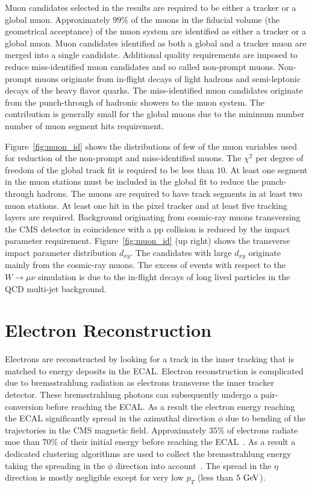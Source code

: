 Muon candidates selected in the results are required to be either a tracker or a global muon. Approximately $99\%$ of the muons in the fiducial volume (the geometrical acceptance) of the muon system are identified as either a tracker or a global muon. Muon candidates identified as both a global and a tracker muon are merged into a single candidate.  Additional quality requirements are imposed to reduce miss-identified muon candidates and so called non-prompt muons. Non-prompt muons originate from in-flight decays of light hadrons and semi-leptonic decays of the heavy flavor quarks. The miss-identified muon candidates originate from the punch-through of hadronic showers to the muon system. The contribution is generally small for the global muons due to the minimum number number of muon segment hits requirement. 

Figure~\ref{fig:muon_id} shows the distributions of few of the muon variables used for reduction of the non-prompt and miss-identified muons. The  $\chi^2$ per degree of freedom of the global track fit is required to be less than $10$. At least one segment in the muon stations must be included in the global fit to reduce the punch-through hadrons. The muons are required to have track segments in at least two muon stations. At least one hit in the pixel tracker and at least five tracking layers are required. Background originating from cosmic-ray muons transversing the CMS detector in coincidence with a pp collision is reduced by the impact parameter requirement. Figure~\ref{fig:muon_id} (up right) shows the transverse impact parameter distribution $d_{xy}$. The candidates with large $d_{xy}$ originate mainly from the cosmic-ray muons.  The excess of events with respect to the $W \rightarrow \mu\nu$ simulation is due to the in-flight decays of long lived particles in the QCD multi-jet background. 

\section{Electron Reconstruction}

Electrons are reconstructed by looking for a track in the inner tracking that is matched to energy deposits in the ECAL. Electron reconstruction is complicated due to bremsstrahlung radiation as electrons transverse the inner tracker detector. These bremsstrahlung photons can subsequently undergo a pair-conversion before reaching the ECAL. As a result the electron energy reaching the ECAL significantly spread in the azimuthal direction $\phi$ due to bending of the trajectories in the CMS magnetic field. Approximately $35\%$ of electrons radiate moe than $70\%$ of their initial energy before reaching the ECAL~\cite{Chatrchyan:2014fea,Baffioni:2006cd}. As a result a dedicated clustering algorithms are used to collect the bremsstrahlung energy taking the spreading in the $\phi$ direction into account~\cite{Meschi:2001lfa}.  The spread in the $\eta$ direction is mostly negligible except for very low $p_{T}$ (less than $5~\mathrm{Ge\kern -0.1em V}$).    

